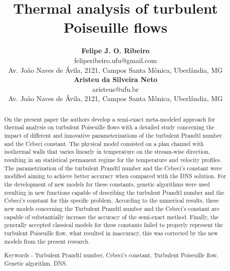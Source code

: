 \documentclass[10pt]{article} %
\title{ \loll Thermal analysis of turbulent Poiseuille flows}
\author{\textbf{Felipe J. O. Ribeiro} \\ 
	    \small{feliperibeiro.ufu@gmail.com} \\
	    \vspace{0.2cm}
	    \small{Av. Jo\~{a}o Naves de \'Avila, 2121, Campos Santa M\^{o}nica, Uberl\^{a}ndia, MG}\\
	    \textbf{Aristeu da Silveira Neto}\\
	    \small{aristeus@ufu.br}\\
    \small{Av. Jo\~{a}o Naves de \'Avila, 2121, Campos Santa M\^{o}nica, Uberl\^{a}ndia, MG}\\
}
\begin{document}
	

\maketitle


\begin{abstract}
	\noindent On the present paper the authors develop a semi-exact meta-modeled approach for thermal analysis on turbulent Poiseuille flows with a detailed study concerning the impact of different and innovative parameterizations of the turbulent Prandtl number and the Cebeci constant. The physical model consisted on a plan channel with isothermal walls that varies linearly in temperature on the stream-wise direction, resulting in an statistical permanent regime for the temperature and velocity profiles. The parametrization of the turbulent Prandtl number and the Cebeci's constant were modified aiming to achieve better accuracy when compared with the DNS solution. For the development of new models for these constants, genetic algorithms were used resulting in new functions capable of describing the turbulent Prandtl number and the Cebeci's constant for this specific problem. According to the numerical results, these new models concerning the Turbulent Prandtl number and the Cebeci's constant are capable of substantially increase the accuracy of the semi-exact method. Finally, the generally accepted classical models for these constants failed to properly represent the turbulent Poiseuille flow, what resulted in inaccuracy, this was corrected by the new models from the present research. 
	
	\vspace{5.0mm}
	
	\large{Keywords} - \small{Turbulent Prandtl number, Cebeci's constant, Turbulent Poiseuille flow, Genetic algorithm, DNS.}    
\end{abstract} 




\end{document}

